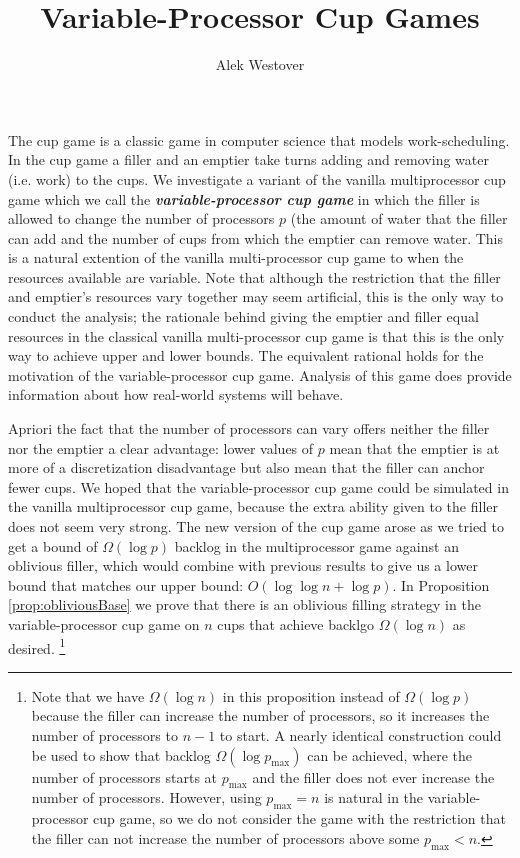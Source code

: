 \documentclass[twocolumn]{article}[11pt]
\title{Variable-Processor Cup Games}
\author{Alek Westover}
\newcommand{\defn}[1]{{\textit{\textbf{\boldmath #1}}}}
\renewcommand{\paragraph}[1]{\vspace{0.09in}\noindent{\bf \boldmath #1.}}
\begin{document}
\maketitle

\paragraph{Introduction}
The cup game is a classic game in computer science that models work-scheduling.
In the cup game a filler and an emptier take turns adding and removing water
(i.e. work) to the cups. We investigate a variant of the vanilla multiprocessor
cup game which we call the \defn{variable-processor cup game} in which the
filler is allowed to change the number of processors $p$ (the amount of water
that the filler can add and the number of cups from which the emptier can
remove water. This is a natural extention of the vanilla multi-processor cup
game to when the resources available are variable. Note that although the
restriction that the filler and emptier's resources vary together may seem
artificial, this is the only way to conduct the analysis; the rationale behind
giving the emptier and filler equal resources in the classical vanilla
multi-processor cup game is that this is the only way to achieve upper and
lower bounds. The equivalent rational holds for the motivation of the
variable-processor cup game. Analysis of this game does provide information
about how real-world systems will behave.

Apriori the fact that the number of processors can vary offers neither the
filler nor the emptier a clear advantage: lower values of $p$ mean that the
emptier is at more of a discretization disadvantage but also mean that the
filler can anchor fewer cups.  We hoped that the variable-processor cup game
could be simulated in the vanilla multiprocessor cup game, because the extra
ability given to the filler does not seem very strong. The new version of the
cup game arose as we tried to get a bound of $\Omega(\log p)$ backlog in the
multiprocessor game against an oblivious filler, which would combine with
previous results to give us a lower bound that matches our upper bound:
$O(\log\log n + \log p)$. In Proposition \ref{prop:obliviousBase} we prove that
there is an oblivious filling strategy in the variable-processor cup game on
$n$ cups that achieve backlgo $\Omega(\log n)$ as desired. \footnote{Note that
  we have $\Omega(\log n)$ in this proposition instead of $\Omega(\log p)$
  because the filler can increase the number of processors, so it increases the
  number of processors to $n-1$ to start. A nearly identical construction could
  be used to show that backlog $\Omega(\log p_{\max})$ can be achieved, where
  the number of processors starts at $p_{\max}$ and the filler does not ever
  increase the number of processors. However, using $p_{\max} = n$ is natural
  in the variable-processor cup game, so we do not consider the game with 
the restriction that the filler can not increase the number of processors above
some $p_{\max} < n$.}
\end{document}
